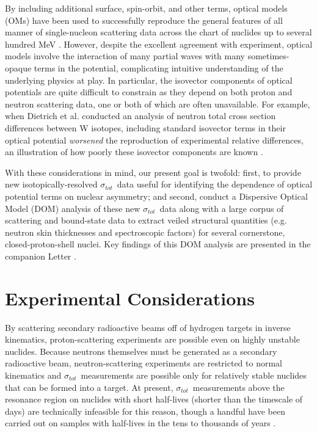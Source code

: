 \documentclass[twocolumn,secnumarabic,amssymb, nobibnotes, aps, prl,
superscriptaddress, nobalancelastpage]{revtex4}
\newcommand{\tot}{\ensuremath{\sigma_{tot}}}
\begin{document}
By including additional surface, spin-orbit, and other terms, optical models (OMs) have been 
used to successfully reproduce the general features of all manner of single-nucleon scattering 
data across the chart of nuclides up to several hundred MeV \cite{Perey1976,
CH89, KoningDelaroche}. However, despite the excellent agreement with experiment, optical models
involve the interaction of many partial waves with many sometimes-opaque terms
in the potential, complicating intuitive understanding of the underlying
physics at play. In particular, the isovector components of optical potentials
are quite difficult to constrain as they depend on both proton and neutron 
scattering data, one or both of which are often unavailable. For example,
when Dietrich et al. conducted an analysis of neutron total cross section
differences between W isotopes, including standard isovector terms in their
optical potential \textit{worsened} the reproduction of experimental
relative differences, an
illustration of how poorly these isovector components are known \cite{Dietrich2003}.

With these considerations in mind, our present goal is twofold: first, to
provide new isotopically-resolved \tot\ data useful for identifying the 
dependence of optical 
potential terms on nuclear asymmetry; and second, conduct a Dispersive Optical Model
(DOM) analysis of these new \tot\ data along with a large corpus of scattering
and bound-state data to extract veiled structural quantities (e.g. neutron skin
thicknesses and spectroscopic factors) for several cornerstone, closed-proton-shell nuclei.
Key findings of this DOM analysis are presented in the companion Letter \cite{Pruitt2020PRL}.

\section{Experimental Considerations}
By scattering secondary radioactive beams off of hydrogen targets in inverse
kinematics, proton-scattering experiments are possible even on highly unstable
nuclides. Because neutrons themselves must be generated as a
secondary radioactive beam, neutron-scattering experiments are restricted to
normal kinematics and \tot\ measurements are possible only for relatively stable
nuclides that can be formed into a target. At present, \tot\ measurements above
the resonance region on nuclides with short half-lives (shorter than the timescale of
days) are technically infeasible for this reason, though a handful have been carried out on
samples with half-lives in the tens to thousands of years \cite{Poenitz1983,
Phillips1980, Foster1971}.
\end{document}
